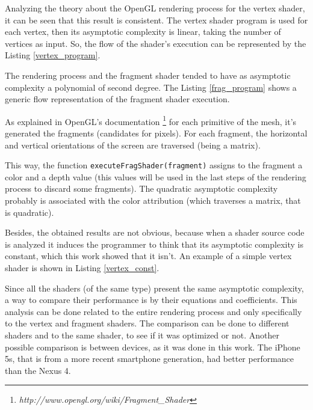 \documentclass[10pt, conference, compsocconf]{IEEEtran}
\begin{document}
{Analyzing the theory about the OpenGL rendering process for the vertex shader,
it can be seen that this result is consistent. The vertex shader program
is used for each vertex, then its asymptotic complexity is linear, taking the number of vertices as input. So,
the flow of the shader's execution can be represented by the Listing \ref{vertex_program}.



The rendering process and the fragment shader tended to have as
asymptotic complexity a polynomial of second degree. The Listing \ref{frag_program}
shows a generic flow representation of the fragment shader execution.



As explained in OpenGL's documentation
\footnote{\textit{http://www.opengl.org/wiki/Fragment\_Shader}}
 for each primitive of the mesh, it's generated the fragments (candidates
for pixels). For each fragment, the horizontal and vertical orientations
of the screen are traversed (being a matrix).

This way, the function \texttt{executeFragShader(fragment)} assigns
to the fragment a color and a depth value (this values will be used in
the last steps of the rendering process to discard some fragments). 
The quadratic asymptotic complexity probably is associated with 
the color attribution (which traverses a matrix, that is quadratic).

Besides, the obtained results are not obvious, because when a shader source code
is analyzed it induces the programmer to think that its asymptotic complexity
is constant, which this work showed that it isn't. An example of a simple 
vertex shader is shown in Listing \ref{vertex_const}.



Since all the shaders (of the same type) present the same asymptotic 
complexity, a way to compare their performance is by their equations
and coefficients. This analysis can be done related to the entire 
rendering process and only specifically to the vertex and fragment
shaders.  The comparison can be done to different shaders and to
the same shader, to see if it was optimized or not. Another possible comparison 
is between devices, as it was done in this work. The iPhone 5s, that is from a more recent smartphone generation, had
better performance than the Nexus 4.

}
\end{document}
